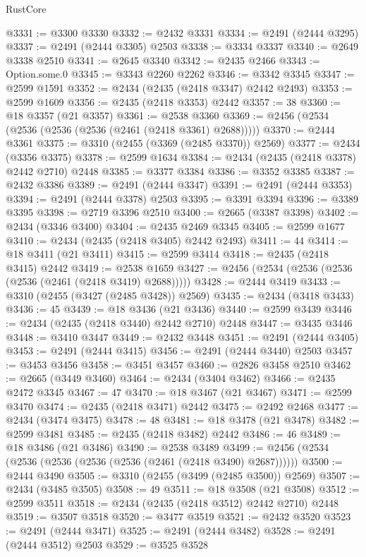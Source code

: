 \begin{lexlean}{RustCore}
\begin{coremodule}
@3331 := @3300 @3330
@3332 := @2432 @3331
@3334 := @2491 (@2444 @3295)
@3337 := @2491 (@2444 @3305) @2503
@3338 := @3334 @3337
@3340 := @2649 @3338 @2510
@3341 := @2645 @3340
@3342 := @2435 @2466
@3343 := Option.some.{0}
@3345 := @3343 @2260 @2262
@3346 := @3342 @3345
@3347 := @2599 @1591
@3352 := @2434 (@2435 (@2418 @3347) @2442 @2493)
@3353 := @2599 @1609
@3356 := @2435 (@2418 @3353) @2442
@3357 := 38
@3360 := @18 @3357 (@21 @3357)
@3361 := @2538 @3360
@3369 := @2456 (@2534 (@2536 (@2536 (@2536 (@2461 (@2418 @3361) @2688)))))
@3370 := @2444 @3361
@3375 := @3310 (@2455 (@3369 (@2485 @3370)) @2569)
@3377 := @2434 (@3356 @3375)
@3378 := @2599 @1634
@3384 := @2434 (@2435 (@2418 @3378) @2442 @2710) @2448
@3385 := @3377 @3384
@3386 := @3352 @3385
@3387 := @2432 @3386
@3389 := @2491 (@2444 @3347)
@3391 := @2491 (@2444 @3353)
@3394 := @2491 (@2444 @3378) @2503
@3395 := @3391 @3394
@3396 := @3389 @3395
@3398 := @2719 @3396 @2510
@3400 := @2665 (@3387 @3398)
@3402 := @2434 (@3346 @3400)
@3404 := @2435 @2469 @3345
@3405 := @2599 @1677
@3410 := @2434 (@2435 (@2418 @3405) @2442 @2493)
@3411 := 44
@3414 := @18 @3411 (@21 @3411)
@3415 := @2599 @3414
@3418 := @2435 (@2418 @3415) @2442
@3419 := @2538 @1659
@3427 := @2456 (@2534 (@2536 (@2536 (@2536 (@2461 (@2418 @3419) @2688)))))
@3428 := @2444 @3419
@3433 := @3310 (@2455 (@3427 (@2485 @3428)) @2569)
@3435 := @2434 (@3418 @3433)
@3436 := 45
@3439 := @18 @3436 (@21 @3436)
@3440 := @2599 @3439
@3446 := @2434 (@2435 (@2418 @3440) @2442 @2710) @2448
@3447 := @3435 @3446
@3448 := @3410 @3447
@3449 := @2432 @3448
@3451 := @2491 (@2444 @3405)
@3453 := @2491 (@2444 @3415)
@3456 := @2491 (@2444 @3440) @2503
@3457 := @3453 @3456
@3458 := @3451 @3457
@3460 := @2826 @3458 @2510
@3462 := @2665 (@3449 @3460)
@3464 := @2434 (@3404 @3462)
@3466 := @2435 @2472 @3345
@3467 := 47
@3470 := @18 @3467 (@21 @3467)
@3471 := @2599 @3470
@3474 := @2435 (@2418 @3471) @2442
@3475 := @2492 @2468
@3477 := @2434 (@3474 @3475)
@3478 := 48
@3481 := @18 @3478 (@21 @3478)
@3482 := @2599 @3481
@3485 := @2435 (@2418 @3482) @2442
@3486 := 46
@3489 := @18 @3486 (@21 @3486)
@3490 := @2538 @3489
@3499 := @2456 (@2534 (@2536 (@2536 (@2536 (@2536 (@2461 (@2418 @3490) @2687))))))
@3500 := @2444 @3490
@3505 := @3310 (@2455 (@3499 (@2485 @3500)) @2569)
@3507 := @2434 (@3485 @3505)
@3508 := 49
@3511 := @18 @3508 (@21 @3508)
@3512 := @2599 @3511
@3518 := @2434 (@2435 (@2418 @3512) @2442 @2710) @2448
@3519 := @3507 @3518
@3520 := @3477 @3519
@3521 := @2432 @3520
@3523 := @2491 (@2444 @3471)
@3525 := @2491 (@2444 @3482)
@3528 := @2491 (@2444 @3512) @2503
@3529 := @3525 @3528

\end{coremodule}
\end{lexlean}
